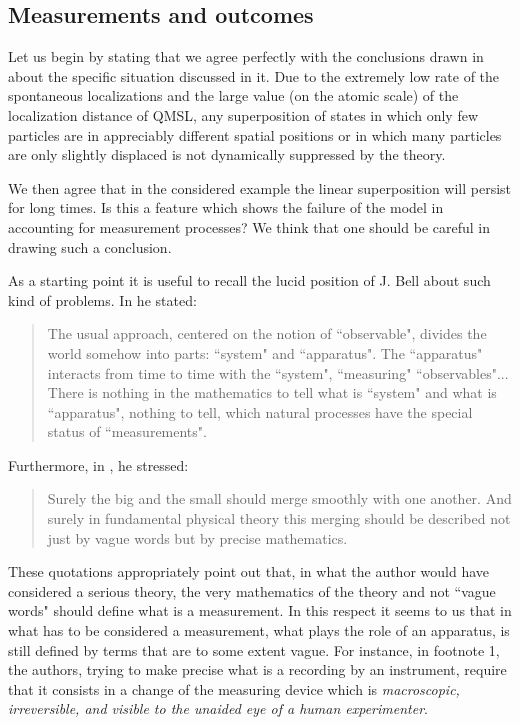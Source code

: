 \documentclass[12pt]{article}
\begin{document}
\subsection{Measurements and outcomes} \label{sec142}

Let us begin by stating that we agree perfectly with the
conclusions drawn in \cite{avp} about the specific situation
discussed in it. Due to the extremely low rate of the spontaneous
localizations and the large value (on the atomic scale) of the
localization distance of QMSL, any superposition of states in
which only few particles are in appreciably different spatial
positions or in which many particles are only slightly displaced
is not dynamically suppressed by the theory.

We then agree that in the considered example the linear
superposition will persist for long times. Is this a feature which
shows the failure of the model in accounting for measurement
processes? We think that one should be careful in drawing such a
conclusion.

As a starting point it is useful to recall the lucid position of
J. Bell about such kind of problems. In \cite{bell84} he stated:
\begin{quotation}
The usual approach, centered on the notion of ``observable",
divides the world somehow into parts: ``system" and ``apparatus".
The ``apparatus" interacts from time to time with the ``system",
``measuring" ``observables"... There is nothing in the mathematics
to tell what is ``system" and what is ``apparatus", nothing to
tell, which natural processes have the special status of
``measurements".
\end{quotation}
Furthermore, in \cite{bellns}, he stressed:
\begin{quotation}
Surely the big and the small should merge smoothly with one
another. And surely in fundamental physical theory this merging
should be described not just by vague words but by precise
mathematics.
\end{quotation}

These quotations appropriately point out that, in what the author
would have considered a serious theory, the very mathematics of
the theory and not ``vague words" should define what is a
measurement. In this respect it seems to us that in \cite{avp}
what has to be considered a measurement, what plays the role of an
apparatus, is still defined by terms that are to some extent
vague. For instance, in footnote 1, the authors, trying to make
precise what is a recording by an instrument, require that it
consists in a change of the measuring device which is {\it
macroscopic, irreversible, and visible to the unaided eye of a
human experimenter}.
\end{document}
